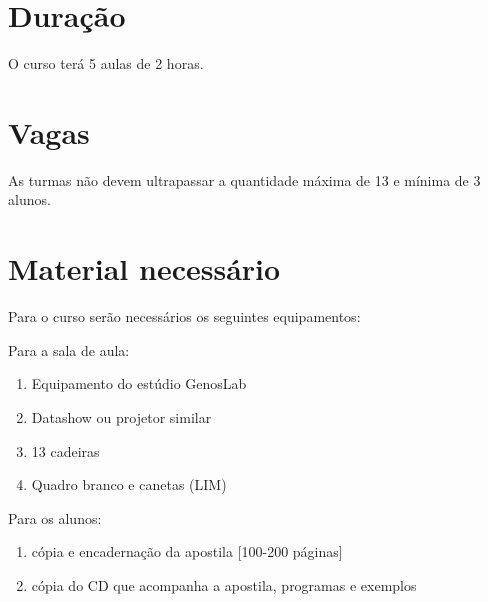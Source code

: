 \documentclass[12pt,brazil]{article}
\begin{document}
\section{Duração}

O curso terá 5 aulas de 2 horas.
 
\section{Vagas}
As turmas não devem ultrapassar a quantidade máxima de 13 e mínima de 3
alunos.

\section{Material necessário}
\label{sec:material}

Para o curso serão necessários os seguintes equipamentos:

Para a sala de aula:
\begin{enumerate}
\item Equipamento do estúdio GenosLab
\item Datashow ou projetor similar
\item 13 cadeiras
\item Quadro branco e canetas (LIM)
\end{enumerate}

Para os alunos:

\begin{enumerate}
\item cópia e encadernação da apostila [100-200 páginas]
\item cópia do CD que acompanha a apostila, programas e exemplos
\end{enumerate}

\newpage



\end{document}
